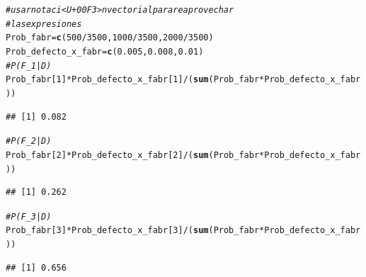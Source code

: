 \documentclass[10pt,a4paper]{article}\usepackage[]{graphicx}\usepackage[]{color}
\makeatletter
\newcommand{\hlnum}[1]{\textcolor[rgb]{0.686,0.059,0.569}{#1}}%
\newcommand{\hlcom}[1]{\textcolor[rgb]{0.678,0.584,0.686}{\textit{#1}}}%
\newcommand{\hlopt}[1]{\textcolor[rgb]{0,0,0}{#1}}%
\newcommand{\hlstd}[1]{\textcolor[rgb]{0.345,0.345,0.345}{#1}}%
\newcommand{\hlkwb}[1]{\textcolor[rgb]{0.69,0.353,0.396}{#1}}%
\newcommand{\hlkwd}[1]{\textcolor[rgb]{0.737,0.353,0.396}{\textbf{#1}}}%
\newenvironment{kframe}{%
 \def\at@end@of@kframe{}%
 \ifinner\ifhmode%
  \def\at@end@of@kframe{\end{minipage}}%
  \begin{minipage}{\columnwidth}%
 \fi\fi%
 \def\FrameCommand##1{\hskip\@totalleftmargin \hskip-\fboxsep
 \colorbox{shadecolor}{##1}\hskip-\fboxsep
     \hskip-\linewidth \hskip-\@totalleftmargin \hskip\columnwidth}%
 \MakeFramed {\advance\hsize-\width
   \@totalleftmargin\z@ \linewidth\hsize
   \@setminipage}}%
 {\par\unskip\endMakeFramed%
 \at@end@of@kframe}
\newenvironment{knitrout}{}{} %
\makeatother
\begin{document}
\begin{knitrout}
\color{fgcolor}\begin{kframe}
\begin{alltt}
\hlcom{# usar notaci<U+00F3>n vectorial para reaprovechar }
\hlcom{# las expresiones}
\hlstd{Prob_fabr} \hlkwb{=} \hlkwd{c}\hlstd{(}\hlnum{500}\hlopt{/}\hlnum{3500}\hlstd{,}\hlnum{1000}\hlopt{/}\hlnum{3500}\hlstd{,} \hlnum{2000}\hlopt{/}\hlnum{3500}\hlstd{)}
\hlstd{Prob_defecto_x_fabr} \hlkwb{=} \hlkwd{c}\hlstd{(}\hlnum{0.005}\hlstd{,}\hlnum{0.008}\hlstd{,} \hlnum{0.01}\hlstd{)}
\hlcom{# P(F_1|D)}
\hlstd{Prob_fabr[}\hlnum{1}\hlstd{]}\hlopt{*}\hlstd{Prob_defecto_x_fabr[}\hlnum{1}\hlstd{]}\hlopt{/}\hlstd{(}\hlkwd{sum}\hlstd{(Prob_fabr}\hlopt{*}\hlstd{Prob_defecto_x_fabr))}
\end{alltt}
\begin{verbatim}
## [1] 0.082
\end{verbatim}
\begin{alltt}
\hlcom{# P(F_2|D)}
\hlstd{Prob_fabr[}\hlnum{2}\hlstd{]}\hlopt{*}\hlstd{Prob_defecto_x_fabr[}\hlnum{2}\hlstd{]}\hlopt{/}\hlstd{(}\hlkwd{sum}\hlstd{(Prob_fabr}\hlopt{*}\hlstd{Prob_defecto_x_fabr))}
\end{alltt}
\begin{verbatim}
## [1] 0.262
\end{verbatim}
\begin{alltt}
\hlcom{# P(F_3|D) }
\hlstd{Prob_fabr[}\hlnum{3}\hlstd{]}\hlopt{*}\hlstd{Prob_defecto_x_fabr[}\hlnum{3}\hlstd{]}\hlopt{/}\hlstd{(}\hlkwd{sum}\hlstd{(Prob_fabr}\hlopt{*}\hlstd{Prob_defecto_x_fabr))}
\end{alltt}
\begin{verbatim}
## [1] 0.656
\end{verbatim}
\end{kframe}
\end{knitrout}
\end{document}
